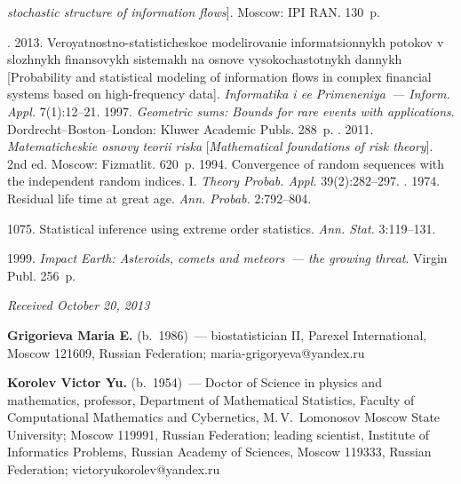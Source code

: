 \begin{multicols}{2}
{{\begin{thebibliography}{99}
\pagebreak

\noindent
\textit{stochastic structure of information 
flows}]. Moscow: IPI RAN. 130~p.


. 
2013. Veroyatnostno-statisticheskoe\linebreak
modelirovanie informatsionnykh potokov v 
slozhnykh finansovykh sistemakh na osnove vysokochastotnykh\linebreak
dannykh [Probability 
and statistical modeling of information flows in complex financial systems based on 
high-frequency data]. \textit{Informatika i ee Primeneniya~--- Inform. Appl.} 7(1):12--21.
 1997.
\textit{Geometric sums: Bounds for rare events with applications}. 
Dordrecht--Boston--London: Kluwer Academic Publs.  288~p.
.
2011. \textit{Matematicheskie osnovy teorii riska}  
[\textit{Mathematical foundations of risk theory}]. 2nd ed. Moscow: Fizmatlit. 620~p.
 1994. 
Convergence of random sequences with the independent random indices. I. 
\textit{Theory Probab.  Appl.} 39(2):282--297.
. 1974. Residual life time at great age.
\textit{Ann. Probab.} 2:792--804. 

 
  1075.
Statistical inference using extreme order statistics.
\textit{Ann. Stat.} 3:119--131.



 1999. \textit{Impact Earth: Asteroids, comets and meteors~--- the growing threat}.
Virgin Publ. 256~p.

\end{thebibliography}
} }

\end{multicols}

\hfill{\small\textit{Received October 20, 2013}}

\Contr

\noindent
\textbf{Grigorieva Maria E.} (b.\ 1986)~--- biostatistician II, 
Parexel International, Moscow 121609, Russian Federation;  maria-grigoryeva@yandex.ru

\vspace*{3pt}

\noindent
\textbf{Korolev Victor Yu.} (b.\ 1954)~--- Doctor of Science in 
physics and mathematics, professor, Department of Mathematical Statistics, 
Faculty of Computational Mathematics and Cybernetics, M.\,V.~Lomonosov
 Moscow State University; Moscow 119991, Russian Federation;
 leading scientist, Institute of Informatics Problems, Russian 
Academy of Sciences, Moscow 119333, Russian Federation; victoryukorolev@yandex.ru 

